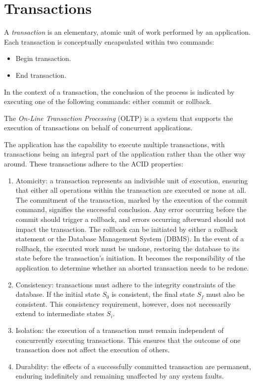 \section{Transactions}

\begin{definition}
    A \emph{transaction} is an elementary, atomic unit of work performed by an application. 
    Each transaction is conceptually encapsulated within two commands:
    \begin{itemize}
        \item Begin transaction.
        \item End transaction.
    \end{itemize}
\end{definition}
In the context of a transaction, the conclusion of the process is indicated by executing one of the following commands: either commit or rollback.
\begin{definition}
    The \emph{On-Line Transaction Processing} (OLTP) is a system that supports the execution of transactions on behalf of concurrent applications. 
\end{definition}
The application has the capability to execute multiple transactions, with transactions being an integral part of the application rather than the other way around. 
These transactions adhere to the ACID properties:
\begin{enumerate}
    \item Atomicity: a transaction represents an indivisible unit of execution, ensuring that either all operations within the transaction are executed or none at all.
        The commitment of the transaction, marked by the execution of the commit command, signifies the successful conclusion. 
        Any error occurring before the commit should trigger a rollback, and errors occurring afterward should not impact the transaction.        
        The rollback can be initiated by either a rollback statement or the Database Management System (DBMS).
        In the event of a rollback, the executed work must be undone, restoring the database to its state before the transaction's initiation.
        It becomes the responsibility of the application to determine whether an aborted transaction needs to be redone.
    \item Consistency: transactions must adhere to the integrity constraints of the database.
        If the initial state $S_0$ is consistent, the final state $S_f$ must also be consistent. 
        This consistency requirement, however, does not necessarily extend to intermediate states $S_i$.
    \item Isolation: the execution of a transaction must remain independent of concurrently executing transactions. 
        This ensures that the outcome of one transaction does not affect the execution of others.
    \item Durability: the effects of a successfully committed transaction are permanent, enduring indefinitely and remaining unaffected by any system faults.
\end{enumerate}

